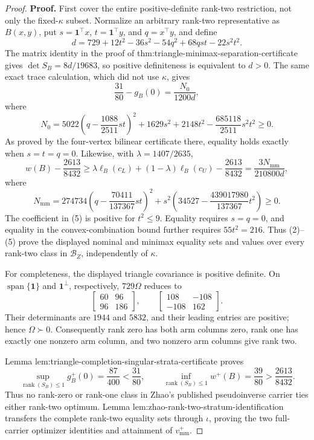 \documentclass{article}
\begin{document}
\begin{proof}
\textbf{Proof.}
First cover the entire positive-definite rank-two restriction, not only the fixed-\(\kappa\) subset.  Normalize an arbitrary rank-two representative as \(B(x,y)\), put \(s=\mathbf1^{\top}x\), \(t=\mathbf1^{\top}y\), and \(q=x^{\top}y\), and define
\[
d=729+12t^2-36s^2-54q^2+68qst-22s^2t^2.
\tag{1}
\]
The matrix identity in the proof of thm:triangle-minimax-separation-certificate gives \(\det S_B=8d/19683\), so positive definiteness is equivalent to \(d>0\).  The same exact trace calculation, which did not use \(\kappa\), gives
\[
\frac{31}{80}-g_B(0)=\frac{N_0}{1200d},
\tag{2}
\]
where
\[
N_0=5022\left(q-\frac{1088}{2511}st\right)^2
+1629s^2+2148t^2-\frac{685118}{2511}s^2t^2\ge0.
\tag{3}
\]
As proved by the four-vertex bilinear certificate there, equality holds exactly when \(s=t=q=0\).  Likewise, with \(\lambda=1407/2635\),
\[
w(B)-\frac{2613}{8432}
\ge\lambda\ell_B(c_L)+(1-\lambda)\ell_B(c_U)-\frac{2613}{8432}
=\frac{3N_{\mathrm{mm}}}{210800d},
\tag{4}
\]
where
\[
N_{\mathrm{mm}}
=274734\left(q-\frac{70411}{137367}st\right)^2
+s^2\left(34527-\frac{439017980}{137367}t^2\right)\ge0.
\tag{5}
\]
The coefficient in (5) is positive for \(t^2\le9\).  Equality requires \(s=q=0\), and equality in the convex-combination bound further requires \(55t^2=216\).  Thus (2)--(5) prove the displayed nominal and minimax equality sets and values over every rank-two class in \(\mathcal B_Z\), independently of \(\kappa\).

For completeness, the displayed triangle covariance is positive definite.  On \(\operatorname{span}\{\mathbf1\}\) and \(\mathbf1^\perp\), respectively, \(729\Omega\) reduces to
\[
\begin{bmatrix}60&96\\96&186\end{bmatrix},
\qquad
\begin{bmatrix}108&-108\\-108&162\end{bmatrix}.
\tag{6}
\]
Their determinants are \(1944\) and \(5832\), and their leading entries are positive; hence \(\Omega\succ0\).  Consequently rank zero has both arm columns zero, rank one has exactly one nonzero arm column, and two nonzero arm columns give rank two.

Lemma lem:triangle-completion-singular-strata-certificate proves
\[
\sup_{\operatorname{rank}(S_B)\le1}g_B^+(0)
=\frac{87}{400}<\frac{31}{80},
\qquad
\inf_{\operatorname{rank}(S_B)\le1}w^+(B)
=\frac{39}{80}>\frac{2613}{8432}.
\tag{7}
\]
Thus no rank-zero or rank-one class in Zhao's published pseudoinverse carrier ties either rank-two optimum.  Lemma lem:zhao-rank-two-stratum-identification transfers the complete rank-two equality sets through \(\iota\), proving the two full-carrier optimizer identities and attainment of \(v_{\mathrm{mm}}^+\).


\end{proof}
\end{document}

